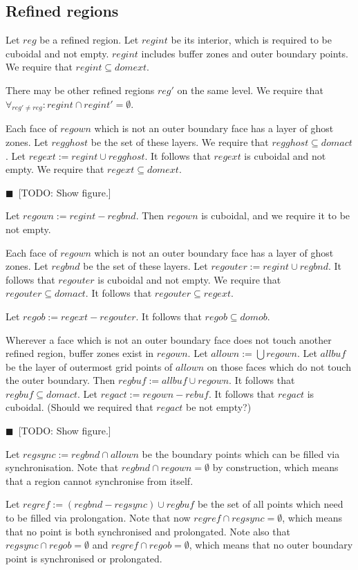 \documentclass[nofootinbib, twocolumn]{revtex4}
\newcommand{\todo}[1]{{\color{blue}$\blacksquare$~\textsf{[TODO: #1]}}}
\begin{document}
\subsection{Refined regions}

Let $reg$ be a refined region.  Let $regint$ be its interior, which is
required to be cuboidal and not empty.  $regint$ includes buffer zones
and outer boundary points.  We require that $regint \subseteq domext$.

There may be other refined regions $reg'$ on the same level.  We
require that $\forall_{reg' \ne reg}: regint \cap regint' =
\emptyset$.

Each face of $regown$ which is not an outer boundary face has a layer
of ghost zones.  Let $regghost$ be the set of these layers.  We
require that $regghost \subseteq domact$.  Let $regext := regint \cup
regghost$.  It follows that $regext$ is cuboidal and not empty.  We
require that $regext \subseteq domext$.

\todo{Show figure.}

Let $regown := regint - regbnd$.  Then $regown$ is cuboidal, and we
require it to be not empty.

Each face of $regown$ which is not an outer boundary face has a layer
of ghost zones.  Let $regbnd$ be the set of these layers.  Let
$regouter := regint \cup regbnd$.  It follows that $regouter$ is
cuboidal and not empty.  We require that $regouter \subseteq domact$.
It follows that $regouter \subseteq regext$.

Let $regob := regext - regouter$.  It follows that $regob \subseteq
domob$.

Wherever a face which is not an outer boundary face does not touch
another refined region, buffer zones exist in $regown$.  Let $allown
:= \bigcup regown$.  Let $allbuf$ be the layer of outermost grid
points of $allown$ on those faces which do not touch the outer
boundary.  Then $regbuf := allbuf \cup regown$.  It follows that
$regbuf \subseteq domact$.  Let $regact := regown - rebuf$.  It
follows that $regact$ is cuboidal.  (Should we required that $regact$
be not empty?)

\todo{Show figure.}

Let $regsync := regbnd \cap allown$ be the boundary points which can
be filled via synchronisation.  Note that $regbnd \cap regown =
\emptyset$ by construction, which means that a region cannot
synchronise from itself.

Let $regref := (regbnd - regsync) \cup regbuf$ be the set of all
points which need to be filled via prolongation.  Note that now
$regref \cap regsync = \emptyset$, which means that no point is both
synchronised and prolongated.  Note also that $regsync \cap regob =
\emptyset$ and $regref \cap regob = \emptyset$, which means that no
outer boundary point is synchronised or prolongated.
\end{document}
